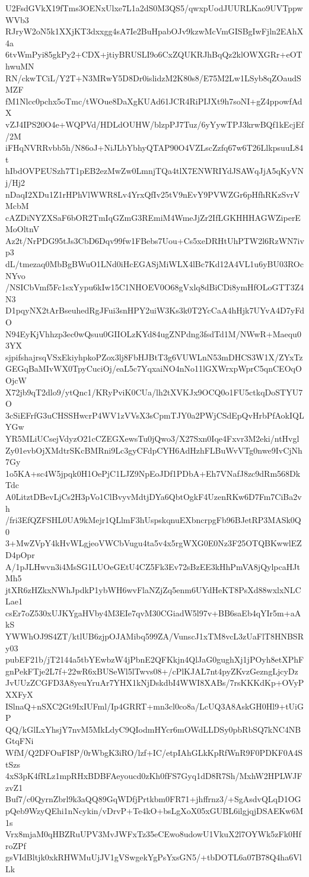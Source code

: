 U2FsdGVkX19fTms3OENxUlxe7L1a2dS0M3QS5/qwxpUodJUURLKao9UVTppwWVb3
RJryW2oN5k1XXjKT3dxxgg4sA7Ie2BuHpabOJv9kzwMcVmGISBgIwFjln2EAhX4a
6tvWmPyi85gkPy2+CDX+jtiyBRUSLI9o6CxZQUKRJhBqQz2klOWXGRr+eOThwuMN
RN/ckwTCiL/Y2T+N3MRwY5D8Dr0islidzM2K80s8/E75M2Lw1LSyb8qZOaudSMZF
fM1Nlcc0pchx5oTmc/tWOue8DaXgKUAd61JCR4RiPIJXt9h7soNI+gZ4ppowfAdX
vZJ4IPS20O4e+WQPVd/HDLdOUHW/blzpPJ7Tuz/6yYywTPJ3krwBQf1kEcjEf/2M
iFHqNVRRvbb5h/N86oJ+NiJLbYbhyQTAP90O4VZLscZzfq67w6T26LlkpsuuL84t
hIbdOVPEUSzh7T1pEB2ezMwZw0LmnjTQa4tlX7ENWRIYdJSAWqJjA5qKyVNj/Hj2
nDaqI2XDu1Z1rHPhVlWWR8Lv4YrxQfIv25tV9nEvY9PVWZGr6pHfhRKzSvrVMcbM
cAZDiNYZXSaF6bOR2TmIqGZmG3REmiM4WmeJjZr2IfLGKHHHAGWZiperEMoOltnV
Az2t/NrPDG95tJs3CbD6Dqv99fw1FBebs7Uou+Cs5xeDRHtUhPTW2l6RzWN7ivp3
dL/tmezaq0MbBgBWuO1LNd0iHcEGASjMiWLX4lBc7Kd12A4VL1u6yBU03ROcNYvo
/NSICbVmf5Fc1sxYypu6kIw15C1NHOEV0O68gVxlq8dBiCDi8ymHfOLoGTT3Z4N3
D1pqyNX2tArBseuhedRgJFui3snHPY2uiW3Ks3k0T2YcCaA4hHjk7UYvA4D7yFdO
N94EyKjVhhzp3ec0wQsuu0GIIOLzKYd84ugZNPdng3fsdTd1M/NWwR+Maequ03YX
sjpifshajrsqVSxEkiyhpkoPZox3lj8FbHJBtT3g6VUWLnN53mDHCS3W1X/ZYxTz
GEGqBaMIvWX0TpyCuciOj/eaL5c7YqxaiNO4nNo11lGXWrxpWprC5qnCEOqOOjcW
X72jb9qT2dlo9/ytQnc1/KRyPviK0CUa/lh2tXVKJx9OCQ0o1FU5ctkqDoSTYU7O
3cSiEFrfG3uCHSSHwcrP4WV1zVVsX3sCpmTJY0a2PWjCSdEpQvHrbPfAokIQLYGw
YR5MLiUCsejVdyzO21cCZEGXewsTu0jQwo3/X27Sxn0Iqe4Fxvr3M2eki/ntHvgl
Zy01evbOjXMdtrSKcBMRni9Lc3gyCFdpCYH6AdHzhFLBuWvVTg0nwe9IvCjNh7Gy
1o5KA+sc4W5jpqk0H1OePjC1LJZ9NpEoJDf1PDbA+Eh7VNafJ8zc9dRm568DkTdc
A0LitztDBevLjCs2H3pVo1ClBvyvMdtjDYa6QbtOgkF4UzenRKw6D7Fm7CiBa2vh
/fri3EfQZFSHL0UA9kMejr1QLlmF3hUspskqnuEXbncrpgFb96BJetRP3MASk0Q0
3+MwZVpY4kHvWLgjeoVWCbVugu4ta5v4x5rgWXG0E0Nz3F25OTQBKwwlEZD4pOpr
A/1pJLHwvn3i4MsSG1LUOeGEtU4CZ5Fk3Ev72sBzEE3kHhPmVA8jQylpcaHJtMh5
jtXR6zHZkxNWhJpdkP1ybWH6wvFlaNZjZq5enm6UYdHeKT8PsXd88wxlxNLCLae1
csEr7oZ530xUJKYgaHVby4M3EIe7qvM30CGiadW5l97v+BB6saEb4qYIr5m+aAkS
YWWhOJ9S4ZT/ktlUB6zjpOJAMibq599ZA/VunscJ1xTM8vcL3zUaFlT8HNBSRy03
pubEF21b/jT2144a5tbYEwbzW4jPbnE2QFKkjn4QlJaG0gughXj1jPOyh8etXPhF
gnPekFTje2L7f+22wR6xBUSeWl5lTwvs08+/cPlKJAL7nt4pyZKvzGezngLjcyDz
JvUUzZCGFD3A8yeuYruAr7YHX1kNjDskdbI4WWI8XABs/7rsKKKdKp+OVyPXXFyX
ISlnaQ+nSXC2Gt9IxIUFml/Ip4GRRT+mn3cl0co8a/LcUQ3A8AskGH0Hl9+tUiGP
QQ/kGlLxYhsjY7nvM5MkLdyC9QIodmHYcr6mOWdLLDSy0pbRbSQ7kNC4NBGtqFNi
WfM/Q2DFOuFI8P/0rWbgK3iRO/lzf+IC/etpIAhGLkKpRfWnR9F0PDKF0A4StSzs
4xS3pK4fRLz1mpRHxBDBFAeyoucd0zKh0fFS7Gyq1dD8R7Sh/MxhW2HPLWJFzvZ1
Buf7/c0QyrnZbrl9k3aQQ89GqWDfjPrtkbm0FR71+jhffrnz3/+SgAsdvQLqD1OG
pQeb9WzyQEhi1nNcykin/vDrvP+Te4kO+bsLgXoX05xGUBL6ilgjqjDSAEKw6M1s
Vrx8mjaM0qHBZRuUPV3MvJWFxTz35eCEwo8udowU1VkuX2l7OYWk5zFk0HfroZPf
gsVIdBltjk0xkRHWMuUjJV1gVSwgekYgPsYxsGN5/+tbDOTL6a07B78Q4ha6VlLk

